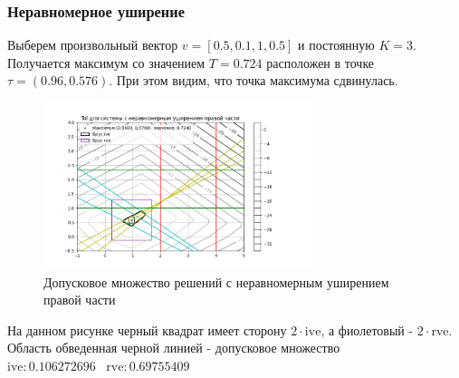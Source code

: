 \documentclass[a4paper,14pt]{article}
\begin{document}
	\subsubsection{Неравномерное уширение}
	Выберем произвольный вектор $v = [0.5, 0.1, 1, 0.5]$ и постоянную $K = 3$. \\
	Получается максимум со значением $T=0.724$ расположен в точке $\tau=(0.96, 0.576)$. При этом видим, что точка максимума сдвинулась.
	\begin{figure}[H] \label{MatrixCorrSet}
		\centering
		\includegraphics[width=0.7\textwidth]{../src/pic/uneven_right.png}
		\caption{Допусковое множество решений с неравномерным уширением правой части} 
	\end{figure}
	\noindent На данном рисунке черный квадрат имеет сторону $2\cdot \mathrm{ive}$, а фиолетовый - $2\cdot \mathrm{rve}$. Область обведенная черной линией - допусковое множество\\
	$\mathrm{ive}: 0.106272696 \;\;\;\mathrm{rve}: 0.69755409$
	
\end{document}
